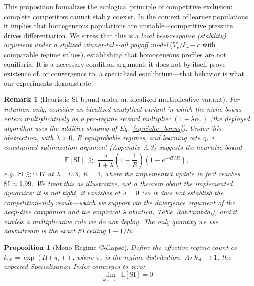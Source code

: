 \documentclass{article}
\newtheorem{proposition}{Proposition}
\newtheorem{remark}{Remark}
\newcommand{\SI}{\text{SI}}
\newcommand{\E}{\mathbb{E}}
\begin{document}
This proposition formalizes the ecological principle of competitive exclusion: complete competitors cannot stably coexist. In the context of learner populations, it implies that homogeneous populations are unstable---competitive pressure drives differentiation. We stress that this is a \emph{local best-response (stability) argument under a stylized winner-take-all payoff model} ($V_r/k_r - c$ with comparable regime values), establishing that homogeneous profiles are not equilibria. It is a necessary-condition argument; it does not by itself prove existence of, or convergence to, a specialized equilibrium---that behavior is what our experiments demonstrate.

\begin{remark}[Heuristic SI bound under an idealized multiplicative variant]
\label{rem:bound}
For intuition only, consider an \emph{idealized analytical variant} in which the
niche bonus enters \emph{multiplicatively} as a per-regime reward multiplier
$(1 + \lambda \alpha_{r})$ (the deployed algorithm uses the additive shaping of
Eq.~\eqref{eq:niche_bonus}). Under this abstraction, with $\lambda > 0$, $R$
equiprobable regimes, and learning rate $\eta$, a constrained-optimization argument
(Appendix~A.3) suggests the heuristic bound
\[
    \E[\SI] \;\gtrsim\; \frac{\lambda}{1 + \lambda}\left(1 - \frac{1}{R}\right)\left(1 - e^{-\eta T / R}\right),
\]
e.g.\ $\SI \gtrsim 0.17$ at $\lambda = 0.3$, $R = 4$, where the implemented update
in fact reaches $\SI \approx 0.99$. We treat this as illustrative, \emph{not} a
theorem about the implemented dynamics: it is not tight, it \emph{vanishes at
$\lambda = 0$} (so it does not establish the competition-only result---which we
support via the divergence argument of the deep-dive companion
\cite{li2026emergent} and the empirical $\lambda$ ablation, Table~\ref{tab:lambda}),
and it models a multiplicative rule we do not deploy. The only quantity we use
downstream is the exact SI \emph{ceiling} $1 - 1/R$.
\end{remark}

\begin{proposition}[Mono-Regime Collapse]
\label{prop:collapse}
Define the effective regime count as $k_{\text{eff}} = \exp(H(\pi_r))$, where $\pi_r$ is the regime distribution. As $k_{\text{eff}} \to 1$, the expected Specialization Index converges to zero:
\begin{equation}
    \lim_{k_{\text{eff}} \to 1} \E[\SI] = 0
\end{equation}
\end{proposition}
\end{document}
